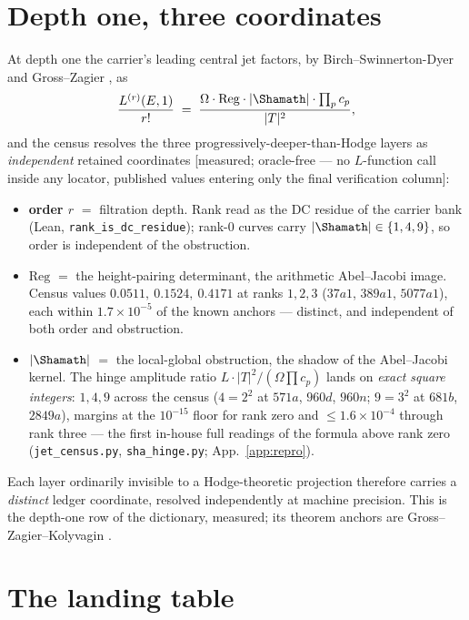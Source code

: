 \documentclass[11pt]{article}
\theoremstyle{definition}
\theoremstyle{remark}
\begin{document}
\section{Depth one, three coordinates}\label{sec:depthone}

At depth one the carrier's leading central jet factors, by
Birch--Swinnerton-Dyer and Gross--Zagier \cite{BSD,GrossZagier}, as
\[
  \frac{L^{(r)}(E,1)}{r!}
  \;=\;
  \frac{\Omega\cdot\mathrm{Reg}\cdot|\Shamath|\cdot\prod_p c_p}{|T|^{2}},
\]
and the census resolves the three progressively-deeper-than-Hodge layers as
\emph{independent} retained coordinates [measured; oracle-free --- no
$L$-function call inside any locator, published values entering only the final
verification column]:
\begin{itemize}
\item \textbf{order $r$} $=$ filtration depth. Rank read as the DC residue of
the carrier bank (Lean, \texttt{rank\_is\_dc\_residue}); rank-$0$ curves carry
$|\Shamath|\in\{1,4,9\}$, so order is independent of the obstruction.
\item \textbf{$\mathrm{Reg}$} $=$ the height-pairing determinant, the
arithmetic Abel--Jacobi image. Census values $0.0511,\ 0.1524,\ 0.4171$ at
ranks $1,2,3$ ($37a1$, $389a1$, $5077a1$), each within $1.7\times10^{-5}$ of
the known anchors --- distinct, and independent of both order and obstruction.
\item \textbf{$|\Shamath|$} $=$ the local-global obstruction, the shadow of the
Abel--Jacobi kernel. The hinge amplitude ratio $L\cdot|T|^2/(\Omega\prod c_p)$
lands on \emph{exact square integers}: $1,4,9$ across the census
($4=2^2$ at $571a$, $960d$, $960n$; $9=3^2$ at $681b$, $2849a$), margins at the
$10^{-15}$ floor for rank zero and $\le1.6\times10^{-4}$ through rank three ---
the first in-house full readings of the formula above rank zero
(\texttt{jet\_census.py}, \texttt{sha\_hinge.py}; App.~\ref{app:repro}).
\end{itemize}
Each layer ordinarily invisible to a Hodge-theoretic projection therefore
carries a \emph{distinct} ledger coordinate, resolved independently at machine
precision. This is the depth-one row of the dictionary, measured; its
theorem anchors are Gross--Zagier--Kolyvagin \cite{GrossZagier,Kolyvagin}.

\section{The landing table}\label{sec:landings}
\end{document}
